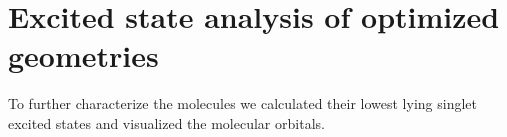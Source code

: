 \begin{comment}
\begin{table}[H]
\caption{Total and relative energies of the the 10 conformers of cAB-1c-tolan. They are sorted by their respective population at room temperature.}
\centering
\begin{tabular}{@{}lllll@{}}
\toprule
molecule name            & Total energy (eV) & E\_rel (eV) & Pop   & Rank \\ \midrule
cAB-1c-tolan-crest-rot7  & -32328.584        & 0.000       & 0.142 & 1    \\
cAB-1c-tolan-crest-rot5  & -32328.582        & 0.002       & 0.132 & 2    \\
cAB-1c-tolan-crest-rot6  & -32328.582        & 0.002       & 0.130 & 3    \\
cAB-1c-tolan-crest-rot8  & -32328.579        & 0.005       & 0.117 & 4    \\
cAB-1c-tolan-crest-rot2  & -32328.572        & 0.012       & 0.087 & 5    \\
cAB-1c-tolan-crest-rot1  & -32328.571        & 0.014       & 0.083 & 6    \\
cAB-1c-tolan-crest-rot4  & -32328.570        & 0.015       & 0.080 & 7    \\
cAB-1c-tolan-crest-rot10 & -32328.569        & 0.015       & 0.078 & 8    \\
cAB-1c-tolan-crest-rot3  & -32328.569        & 0.015       & 0.078 & 9    \\
cAB-1c-tolan-crest-rot9  & -32328.567        & 0.017       & 0.072 & 10   \\ \bottomrule
\end{tabular}
\end{table}
\end{comment}
%
%
\section{Excited state analysis of optimized geometries}
To further characterize the molecules we calculated their lowest lying singlet excited states and visualized the molecular orbitals. \\
%

